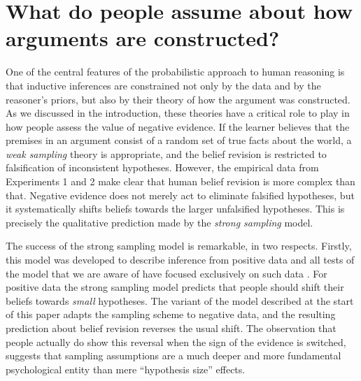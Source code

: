 \documentclass[authoryear,11pt]{elsarticle}
\begin{document}
\section{What do people assume about how arguments are constructed?}

One of the central features of the probabilistic approach to human reasoning is that inductive inferences are constrained not only by the data and by the reasoner's priors, but also by their theory of how the argument was constructed. As we discussed in the introduction, these theories have a critical role to play in how people assess the value of negative evidence. If the learner believes that the premises in an argument consist of a random set of true facts about the world, a {\it weak sampling} theory is appropriate, and the belief revision is restricted to falsification of inconsistent hypotheses. However, the empirical data from Experiments 1 and 2 make clear that human belief revision is more complex than that. Negative evidence does not merely act to eliminate falsified hypotheses, but it systematically shifts beliefs towards the larger unfalsified hypotheses. This is precisely the qualitative prediction made by the {\it strong sampling} model.

The success of the strong sampling model is remarkable, in two respects. Firstly, this model was developed to describe inference from positive data \citep{TenenbaumGriffiths2001} and all tests of the model that we are aware of have focused exclusively on such data \citep[e.g.][]{Fernbach2006, SanjanaTenenbaum2003,TenenbaumGriffiths2001,XuTenenbaum2007,xu_sensitivity_2007,gweon_infants_2010,Navarroetal2012,Ransometalsubmitted}. For positive data the strong sampling model predicts that people should shift their beliefs towards {\it small} hypotheses. The variant of the model described at the start of this paper adapts the sampling scheme to negative data, and the resulting prediction about belief revision reverses the usual shift. The observation that people actually do show this reversal when the sign of the evidence is switched, suggests that sampling assumptions are a much deeper and more fundamental psychological entity than mere ``hypothesis size'' effects.
\end{document}
